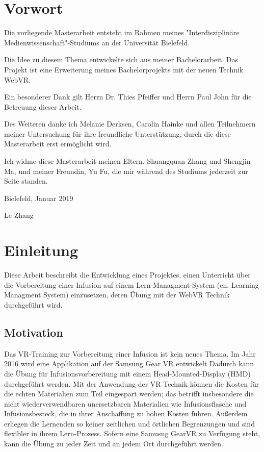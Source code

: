 \chapter*{Vorwort}

Die vorliegende Masterarbeit entsteht im Rahmen meines "Interdisziplinäre Medienwissenschaft"-Studiums an der Universität Bielefeld.
 
Die Idee zu diesem Thema entwickelte sich aus meiner Bachelorarbeit. Das Projekt ist eine Erweiterung meines Bachelorprojekts mit der neuen Technik WebVR.
 
Ein besonderer Dank gilt Herrn Dr. Thies Pfeiffer und Herrn Paul John für die Betreuung dieser Arbeit.
 
Des Weiteren danke ich Melanie Derksen, Carolin Hainke und allen Teilnehmern meiner Untersuchung für ihre freundliche Unterstützung, durch die diese Masterarbeit erst ermöglicht wird.
 
Ich widme diese Masterarbeit meinen Eltern, Shuangquan Zhang und Shengjin Ma, und meiner Freundin, Yu Fu, die mir während des Studiums jederzeit zur Seite standen.

\vspace{5mm}
 
Bielefeld, Januar 2019
 
Le Zhang

\chapter{Einleitung}

Diese Arbeit beschreibt die Entwicklung eines Projektes, einen Unterricht über die Vorbereitung einer Infusion auf einem Lern-Managment-System (en. Learning Managment System) einzusetzen, deren Übung mit der WebVR Technik durchgeführt wird.

\section{Motivation}

Das VR-Training zur Vorbereitung einer Infusion ist kein neues Thema. Im Jahr 2016 wird eine Applikation auf der Samsung Gear VR entwickelt\citep{26}
Dadurch kann die Übung für Infusionsvorbereitung mit einem Head-Mounted-Display (HMD) durchgeführt werden. Mit der Anwendung der VR Technik können die Kosten für die echten Materialien zum Teil eingespart werden; das betrifft insbesondere die nicht wiederverwendbaren unersetzbaren Materialien wie Infusionsflasche und Infusionsbesteck, die in ihrer Anschaffung zu hohen Kosten führen. Außerdem erliegen die Lernenden so keiner zeitlichen und örtlichen Begrenzungen und sind flexibler in ihrem Lern-Prozess. Sofern eine Samusng GearVR zu Verfügung steht, kann die Übung zu jeder Zeit und an jedem Ort durchgeführt werden.

